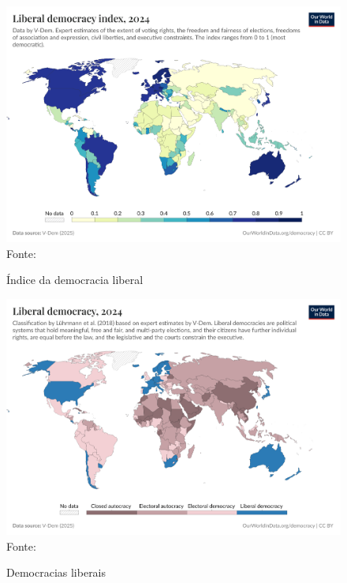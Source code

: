 \begin{figure}[ht]
    \centering
    \caption{Índice da democracia liberal}
    \includegraphics[width=1\linewidth]{figuras/democracia/liberal-democracy-index.png}
    \label{fig:liberal-democracy-index}
    \footnotesize{Fonte: \cite{liberal_democracy_index}}
\end{figure}

\begin{figure}[ht]
    \centering
    \caption{Democracias liberais}
    \includegraphics[width=1\linewidth]{figuras/democracia/liberal-democracy-row.png}
    \label{fig:liberal-democracy-row}
    \footnotesize{Fonte: \cite{liberal_democracy_row}}
\end{figure}

